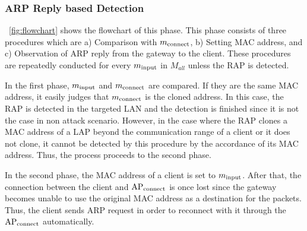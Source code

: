 \documentclass[paper]{ieice}
\newcommand{\tarAP}{\rm AP_{connect}}
\newcommand{\tarMAC}{m_{\rm connect}}
\newcommand{\inputMAC}{m_{\rm input}}
\begin{document}
\subsubsection{ARP Reply based Detection}
\figurename~\ref{fig:flowchart} shows the flowchart of this phase.
This phase consists of three procedures which are a) Comparison with $\tarMAC$, b) Setting MAC address, and c) Observation of ARP reply from the gateway to the client.
These procedures are repeatedly conducted for every $\inputMAC$  in $M_{all}$ unless the RAP is detected.

In the first phase, $\inputMAC$ and $\tarMAC$ are compared.
If they are the same MAC address, it easily judges that $\tarMAC$ is the cloned address.
In this case, the RAP is detected in the targeted LAN and the detection is finished since it is not the case in non attack scenario.
However, in the case where the RAP clones a MAC address of a LAP beyond the communication range of a client or it does not clone, it cannot be detected by this procedure by the accordance of its MAC address.
Thus, the process proceeds to the second phase.

In the second phase, the MAC address of a client is set to $\inputMAC$.
After that, the connection between the client and $\tarAP$ is once lost since the gateway becomes unable to use the original MAC address as a destination for the packets.
Thus, the client sends ARP request in order to reconnect with it through the $\tarAP$ automatically.
\end{document}
